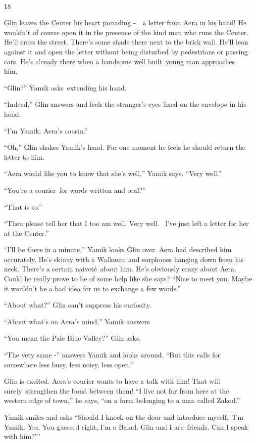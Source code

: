 \documentclass[twoside,11pt]{book}
\begin{document}
~

18 

Glin leaves the Center his heart pounding -\ \ a letter from Aera in his hand! He wouldn't of course open it in the
presence of the kind man who runs the Center. He'll cross the street. There's some shade there next to the brick wall.
He'll lean against it and open the letter without being disturbed by pedestrians or passing cars. He's already there
when a handsome well built\ young man approaches him,~\ 

``Glin?'' Yamik asks~extending his hand. 

``Indeed,'' Glin answers and feels the stranger's eyes fixed on the envelope in his hand. 

``I'm Yamik. Aera's cousin.'' 

``Oh,'' Glin shakes Yamik's hand. For one moment he feels he should return the letter to him.
~

``Aera would like you to know that she's well,'' Yamik says. ``Very
well.'' 

``You're a courier\ for words written and oral?'' 

``That is so.'' 

``Then please tell her that I too am well. Very well.~ I've just left a letter for her at the
Center.'' 

``I'll be there in a minute,'' Yamik looks Glin over. Aera had described him accurately. He's
skinny with a Walkman and earphones hanging down from his neck. There's a certain naivet\'e\ about him. He's obviously
crazy about Aera. Could he really prove to be of some help like she says? ``Nice to meet you. Maybe it
wouldn't be a bad idea for us to exchange a few words.'' 

``About what?'' Glin can't suppress his curiosity.

``About what's on Aera's mind,'' Yamik answers 

``You mean the Pale Blue Valley?'' Glin asks. 

``The very same -'' answers Yamik and looks around. ``But this calls for
somewhere less busy, less noisy, less open.'' 

Glin is excited.  Aera's courier wants to have a talk with him! That will surely\ strengthen the bond between them!
``I live not far from here at the western edge of town,'' he says, ``on a farm
belonging to a man called Zakod.'' 

Yamik smiles and asks ``Should I knock on the door and introduce myself, 'I'm Yamik. Yes. You guessed
right, I'm a Balad. Glin and I are~friends. Can I speak with him?{}''' 
\end{document}
